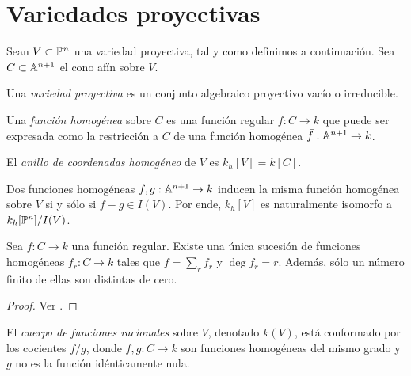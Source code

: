 \section{Variedades proyectivas}

\begin{preliminaries}
Sean $V \subset \P^n$ una variedad proyectiva, tal y como definimos a continuación. Sea $C \subset \A^{n+1}$ el cono afín sobre $V$.
\end{preliminaries}

\begin{definition}
Una \textit{variedad proyectiva} es un conjunto algebraico proyectivo vacío o irreducible.
\end{definition}

\begin{definition}
Una \textit{función homogénea} sobre $C$ es una función regular $f : C \to k$ que puede ser expresada como la restricción a $C$ de una función homogénea $\bar f : \A^{n+1} \to k$.
\end{definition}

\begin{definition}
El \textit{anillo de coordenadas homogéneo} de $V$ es $k_h[V] = k[C]$.
\end{definition}

\begin{remark}
Dos funciones homogéneas $f, g : \A^{n+1} \to k$ inducen la misma función homogénea sobre $V$ si y sólo si $f - g \in I(V)$. Por ende, $k_h[V]$ es naturalmente isomorfo a $k_h[\P^n] / I(V)$.
\end{remark}

\begin{proposition}
Sea $f : C \to k$ una función regular. Existe una única sucesión de funciones homogéneas $f_r : C \to k$ tales que $f = \sum_r f_r$ y $\deg f_r = r$. Además, sólo un número finito de ellas son distintas de cero.
\end{proposition}

\begin{proof}
Ver \cite[p. 92]{fulton}.
\end{proof}

\begin{definition}
El \textit{cuerpo de funciones racionales} sobre $V$, denotado $k(V)$, está conformado por los cocientes $f/g$, donde $f, g : C \to k$ son funciones homogéneas del mismo grado y $g$ no es la función idénticamente nula.
\end{definition}

